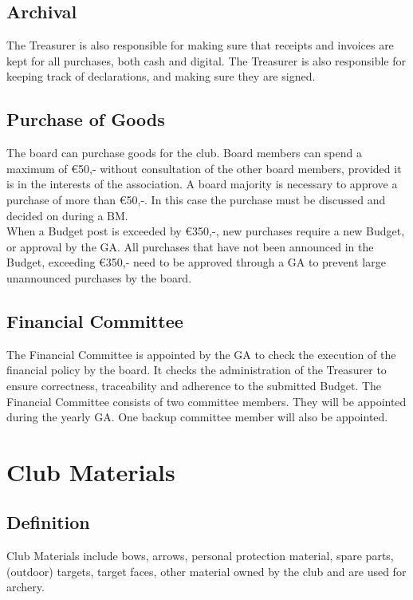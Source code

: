 \documentclass[a4paper]{article}
\begin{document}
\subsection{Archival}
The Treasurer is also responsible for making sure that receipts and invoices are kept for all purchases, both cash and digital. The Treasurer is also responsible for keeping track of declarations, and making sure they are signed.

\subsection{Purchase of Goods}
The board can purchase goods for the club. Board members can spend a maximum of €50,- without consultation of the other board members, provided it is in the interests of the association. A board majority is necessary to approve a purchase of more than €50,-. In this case the purchase must be discussed and decided on during a BM. \\

When a Budget post is exceeded by €350,-, new purchases require a new Budget, or approval by the GA. All purchases that have not been announced in the Budget, exceeding €350,- need to be approved through a GA to prevent large unannounced purchases by the board.

\subsection{Financial Committee}
The Financial Committee is appointed by the GA to check the execution of the financial policy by the board. It checks the administration of the Treasurer to ensure correctness, traceability and adherence to the submitted Budget. The Financial Committee consists of two committee members. They will be appointed during the yearly GA. One backup committee member will also be appointed.

\section{Club Materials}
\subsection{Definition}
Club Materials include bows, arrows, personal protection material, spare parts, (outdoor) targets, target faces, other material owned by the club and are used for archery. \\
\end{document}

